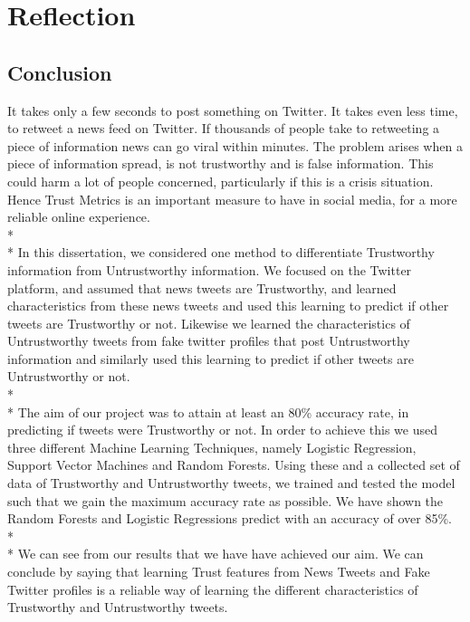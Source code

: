 \chapter{Reflection}
\section{Conclusion}
It takes only a few seconds to post something on Twitter. It takes even less time, to retweet a news feed on Twitter. If thousands of people take to retweeting a piece of information news can go viral within minutes. The problem arises when a piece of information spread, is not trustworthy and is false information. This could harm a lot of people concerned, particularly if this is a crisis situation. Hence Trust Metrics is an important measure to have in social media, for a more reliable online experience.\\*\\*
In this dissertation, we considered one method to differentiate Trustworthy information from Untrustworthy information. We focused on the Twitter platform, and assumed that news tweets are Trustworthy, and learned characteristics from these news tweets and used this learning to predict if other tweets are Trustworthy or not. Likewise we learned the characteristics of Untrustworthy tweets from fake twitter profiles that post Untrustworthy information and similarly used this learning to predict if other tweets are Untrustworthy or not. \\*\\*
The aim of our project was to attain at least an 80\% accuracy rate, in predicting if tweets were Trustworthy or not. In order to achieve this we used three different Machine Learning Techniques, namely Logistic Regression, Support Vector Machines and Random Forests. Using these and a collected set of data of Trustworthy and Untrustworthy tweets, we trained and tested the model such that we gain the maximum accuracy rate as possible. We have shown the Random Forests and Logistic Regressions predict with an accuracy of over 85\%. \\*\\*
We can see from our results that we have have achieved our aim. We can conclude by saying that learning Trust features from News Tweets and Fake Twitter profiles is a reliable way of learning the different characteristics of Trustworthy and Untrustworthy tweets. 
